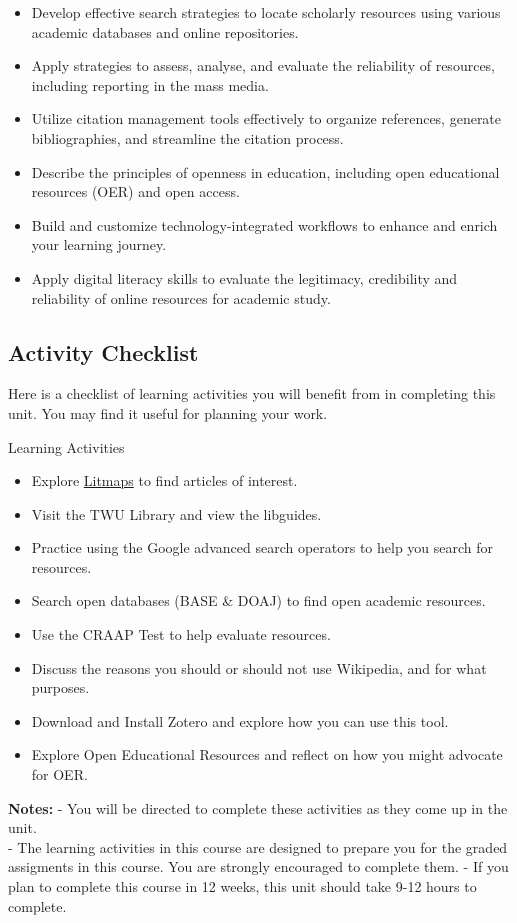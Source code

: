\documentclass[
]{book}
\providecommand{\tightlist}{%
  \setlength{\itemsep}{0pt}\setlength{\parskip}{0pt}}
\theoremstyle{definition}
\theoremstyle{definition}
\theoremstyle{definition}
\theoremstyle{definition}
\theoremstyle{remark}
\begin{document}
\begin{itemize}
\tightlist
\item
  Develop effective search strategies to locate scholarly resources using various academic databases and online repositories.
\item
  Apply strategies to assess, analyse, and evaluate the reliability of resources, including reporting in the mass media.
\item
  Utilize citation management tools effectively to organize references, generate bibliographies, and streamline the citation process.
\item
  Describe the principles of openness in education, including open educational resources (OER) and open access.
\item
  Build and customize technology-integrated workflows to enhance and enrich your learning journey.
\item
  Apply digital literacy skills to evaluate the legitimacy, credibility and reliability of online resources for academic study.
\end{itemize}

\hypertarget{activity-checklist-1}{%
\subsection*{Activity Checklist}\label{activity-checklist-1}}

Here is a checklist of learning activities you will benefit from in completing this unit. You may find it useful for planning your work.

\begin{reflect}
{Learning Activities}

\begin{itemize}
\tightlist
\item
  Explore \href{https://litmaps.com}{Litmaps} to find articles of interest.
\item
  Visit the TWU Library and view the libguides.
\item
  Practice using the Google advanced search operators to help you search for resources.
\item
  Search open databases (BASE \& DOAJ) to find open academic resources.
\item
  Use the CRAAP Test to help evaluate resources.
\item
  Discuss the reasons you should or should not use Wikipedia, and for what purposes.
\item
  Download and Install Zotero and explore how you can use this tool.
\item
  Explore Open Educational Resources and reflect on how you might advocate for OER.
\end{itemize}

\textbf{Notes:}
- You will be directed to complete these activities as they come up in the unit.\\
- The learning activities in this course are designed to prepare you for the graded assigments in this course. You are strongly encouraged to complete them.
- If you plan to complete this course in 12 weeks, this unit should take 9-12 hours to complete.
\end{reflect}
\end{document}
